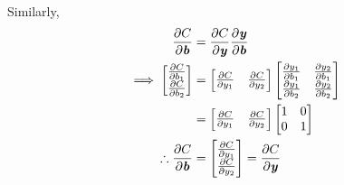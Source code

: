 \documentclass{article}
\begin{document}
\begin{enumerate}
            Similarly,
            \begin{equation}
                \begin{split}
                    \frac{\partial C}{\partial \textbf{\textit{b}}}&=\frac{\partial C}{\partial \textbf{\textit{y}}}\frac{\partial \textbf{\textit{y}}}{\partial \textbf{\textit{b}}}\\
                    \implies\begin{bmatrix}
                                \frac{\partial C}{\partial b_{1}}\\
                                \frac{\partial C}{\partial b_{2}}
                             \end{bmatrix}
                             &=
                             \begin{bmatrix}
                                \frac{\partial C}{\partial y_{1}}&\frac{\partial C}{\partial y_{2}}
                            \end{bmatrix}
                            \begin{bmatrix}
                                \frac{\partial y_{1}}{\partial b_{1}}&\frac{\partial y_{2}}{\partial b_{1}}\\
                                \frac{\partial y_{1}}{\partial b_{2}}&\frac{\partial y_{2}}{\partial b_{2}}
                            \end{bmatrix}\\
                            &=
                             \begin{bmatrix}
                                \frac{\partial C}{\partial y_{1}}&\frac{\partial C}{\partial y_{2}}
                            \end{bmatrix}
                            \begin{bmatrix}
                                1&0\\
                                0&1
                            \end{bmatrix}\\
            \therefore\frac{\partial C}{\partial \textbf{\textit{b}}}&=
                            \begin{bmatrix}
                                \frac{\partial C}{\partial y_{1}}\\
                                \frac{\partial C}{\partial y_{2}}
                            \end{bmatrix} = \frac{\partial C}{\partial \textbf{\textit{y}}}
                \end{split}

\end{equation}
\end{enumerate}
\end{document}
